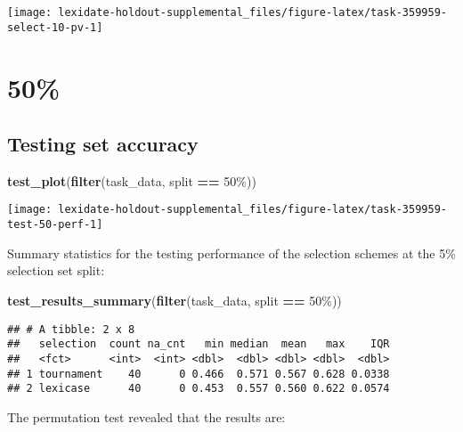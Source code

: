 \documentclass[
]{book}
\newenvironment{Shaded}{\begin{snugshade}}{\end{snugshade}}
\newcommand{\FunctionTok}[1]{\textcolor[rgb]{0.13,0.29,0.53}{\textbf{#1}}}
\newcommand{\NormalTok}[1]{#1}
\newcommand{\SpecialCharTok}[1]{\textcolor[rgb]{0.81,0.36,0.00}{\textbf{#1}}}
\newcommand{\StringTok}[1]{\textcolor[rgb]{0.31,0.60,0.02}{#1}}
\begin{document}
\texttt{[image: lexidate-holdout-supplemental\_files/figure-latex/task-359959-select-10-pv-1]}

\hypertarget{section-37}{%
\section{50\%}\label{section-37}}

\hypertarget{testing-set-accuracy-37}{%
\subsection{Testing set accuracy}\label{testing-set-accuracy-37}}

\begin{Shaded}
\begin{Highlighting}[]
\FunctionTok{test\_plot}\NormalTok{(}\FunctionTok{filter}\NormalTok{(task\_data, split }\SpecialCharTok{==} \StringTok{\textquotesingle{}50\%\textquotesingle{}}\NormalTok{))}
\end{Highlighting}
\end{Shaded}

\texttt{[image: lexidate-holdout-supplemental\_files/figure-latex/task-359959-test-50-perf-1]}

Summary statistics for the testing performance of the selection schemes at the 5\% selection set split:

\begin{Shaded}
\begin{Highlighting}[]
\FunctionTok{test\_results\_summary}\NormalTok{(}\FunctionTok{filter}\NormalTok{(task\_data, split }\SpecialCharTok{==} \StringTok{\textquotesingle{}50\%\textquotesingle{}}\NormalTok{))}
\end{Highlighting}
\end{Shaded}

\begin{verbatim}
## # A tibble: 2 x 8
##   selection  count na_cnt   min median  mean   max    IQR
##   <fct>      <int>  <int> <dbl>  <dbl> <dbl> <dbl>  <dbl>
## 1 tournament    40      0 0.466  0.571 0.567 0.628 0.0338
## 2 lexicase      40      0 0.453  0.557 0.560 0.622 0.0574
\end{verbatim}

The permutation test revealed that the results are:
\end{document}
